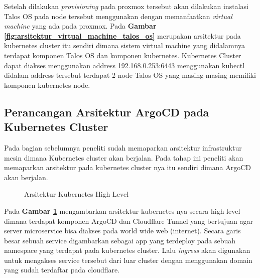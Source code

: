 Setelah dilakukan \textit{provisioning} pada proxmox tersebut akan dilakukan
instalasi Talos OS pada node tersebut menggunakan dengan memanfaatkan
\textit{virtual machine} yang ada pada proxmox. Pada \textbf{Gambar
  \ref{fig:arsitektur_virtual_machine_talos_os}} merupakan arsitektur pada
kubernetes cluster itu sendiri dimana sistem virtual machine yang didalamnya
terdapat komponen Talos OS dan komponen kubernetes. Kubernetes Cluster dapat
diakses menggunakan address 192.168.0.253:6443 menggunakan kubectl didalam
address tersebut terdapat 2 node Talos OS yang masing-masing memiliki komponen
kubernetes node.

\subsection{Perancangan Arsitektur ArgoCD pada Kubernetes Cluster}
Pada bagian sebelumnya peneliti sudah memaparkan arsitektur infrastruktur mesin
dimana Kubernetes cluster akan berjalan. Pada tahap ini peneliti akan
memaparkan arsitektur pada kubernetes cluster nya itu sendiri dimana ArgoCD
akan berjalan.
\begin{figure}[H]
  \centering
  \caption{Arsitektur Kubernetes High Level}
  \label{fig:arsitektur_kubernetes_inside_proxmox}
\end{figure}

Pada \textbf{Gambar \ref{fig:arsitektur_kubernetes_inside_proxmox}}
mengambarkan arsitektur kubernetes nya secara high level dimana terdapat
komponen ArgoCD dan Cloudflare Tunnel yang bertujuan agar server microservice
bisa diakses pada world wide web (internet). Secara garis besar sebuah service
digambarkan sebagai app yang terdeploy pada sebuah namespace yang terdapat pada
kubernetes cluster. Lalu \textit{ingress} akan digunakan untuk mengakses
service tersebut dari luar cluster dengan menggunakan domain yang sudah
terdaftar pada cloudflare.

